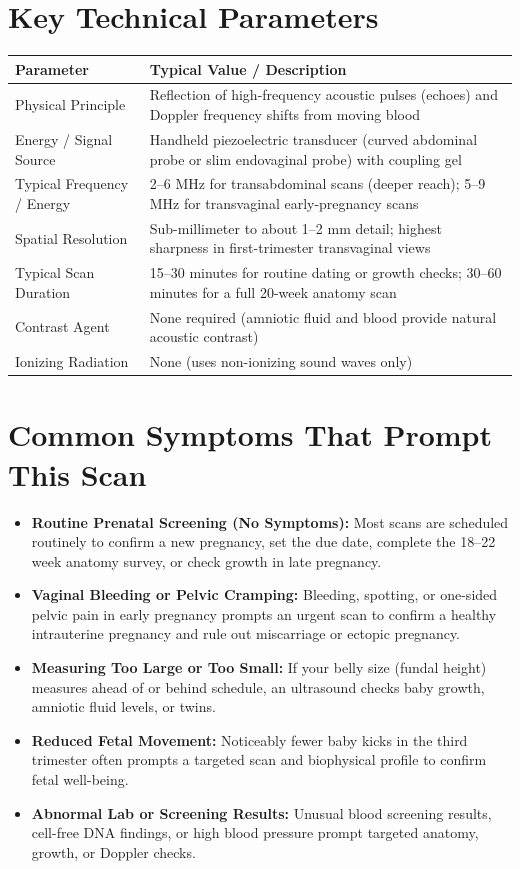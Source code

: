 \section{Key Technical Parameters}
\noindent
\begin{tabularx}{\textwidth}{@{}l X@{}}
\toprule
\textbf{Parameter} & \textbf{Typical Value / Description} \\
\midrule
Physical Principle & Reflection of high-frequency acoustic pulses (echoes) and Doppler frequency shifts from moving blood \\
Energy / Signal Source & Handheld piezoelectric transducer (curved abdominal probe or slim endovaginal probe) with coupling gel \\
Typical Frequency / Energy & 2--6 MHz for transabdominal scans (deeper reach); 5--9 MHz for transvaginal early-pregnancy scans \\
Spatial Resolution & Sub-millimeter to about 1--2 mm detail; highest sharpness in first-trimester transvaginal views \\
Typical Scan Duration & 15--30 minutes for routine dating or growth checks; 30--60 minutes for a full 20-week anatomy scan \\
Contrast Agent & None required (amniotic fluid and blood provide natural acoustic contrast) \\
Ionizing Radiation & None (uses non-ionizing sound waves only) \\
\bottomrule
\end{tabularx}

\section{Common Symptoms That Prompt This Scan}
\begin{itemize}
\item \textbf{Routine Prenatal Screening (No Symptoms):} Most scans are scheduled routinely to confirm a new pregnancy, set the due date, complete the 18--22 week anatomy survey, or check growth in late pregnancy.
\item \textbf{Vaginal Bleeding or Pelvic Cramping:} Bleeding, spotting, or one-sided pelvic pain in early pregnancy prompts an urgent scan to confirm a healthy intrauterine pregnancy and rule out miscarriage or ectopic pregnancy.
\item \textbf{Measuring Too Large or Too Small:} If your belly size (fundal height) measures ahead of or behind schedule, an ultrasound checks baby growth, amniotic fluid levels, or twins.
\item \textbf{Reduced Fetal Movement:} Noticeably fewer baby kicks in the third trimester often prompts a targeted scan and biophysical profile to confirm fetal well-being.
\item \textbf{Abnormal Lab or Screening Results:} Unusual blood screening results, cell-free DNA findings, or high blood pressure prompt targeted anatomy, growth, or Doppler checks.
\end{itemize}

